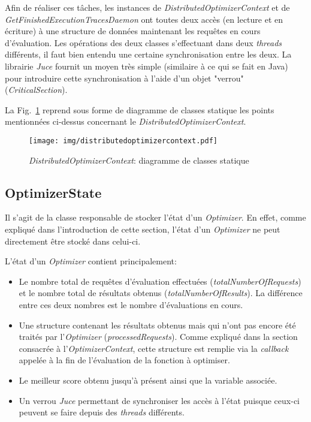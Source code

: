 \documentclass[a4paper, 12pt]{report}
\begin{document}
Afin de réaliser ces tâches, les instances de \textit{DistributedOptimizerContext} et de \textit{GetFinishedExecutionTracesDaemon} ont toutes deux accès (en lecture et en écriture) à une structure de données maintenant les requêtes en cours d'évaluation. Les opérations des deux classes s'effectuant dans deux \textit{threads} différents, il faut bien entendu une certaine synchronisation entre les deux. La librairie \textit{Juce} fournit un moyen très simple (similaire à ce qui se fait en Java) pour introduire cette synchronisation à l'aide d'un objet "verrou" (\textit{CriticalSection}).

La Fig.~\ref{distributedoptimizercontext} reprend sous forme de diagramme de classes statique les points mentionnées ci-dessus concernant le \textit{DistributedOptimizerContext}.

\begin{figure}[!b]
\centering
\texttt{[image: img/distributedoptimizercontext.pdf]}
\caption{\textit{DistributedOptimizerContext}: diagramme de classes statique}
\label{distributedoptimizercontext}
\end{figure}

\subsection{OptimizerState}
\label{optimizerstatesection}
Il s'agit de la classe responsable de stocker l'état d'un \textit{Optimizer}. En effet, comme expliqué dans l'introduction de cette section, l'état d'un \textit{Optimizer} ne peut directement être stocké dans celui-ci. 

L'état d'un \textit{Optimizer} contient principalement:
\begin{itemize}
\item Le nombre total de requêtes d'évaluation effectuées (\textit{totalNumberOfRequests}) et le nombre total de résultats obtenus (\textit{totalNumberOfResults}). La différence entre ces deux nombres est le nombre d'évaluations en cours.
\item Une structure contenant les résultats obtenus mais qui n'ont pas encore été traités par l'\textit{Optimizer} (\textit{processedRequests}). Comme expliqué dans la section consacrée à l'\textit{OptimizerContext}, cette structure est remplie via la \textit{callback} appelée à la fin de l'évaluation de la fonction à optimiser.
\item Le meilleur score obtenu jusqu'à présent ainsi que la variable associée.
\item Un verrou \textit{Juce} permettant de synchroniser les accès à l'état puisque ceux-ci peuvent se faire depuis des \textit{threads} différents.
\end{itemize}
\end{document}
